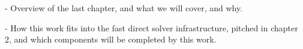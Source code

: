 - Overview of the last chapter, and what we will cover, and why.

- How this work fits into the fast direct solver infrastructure, pitched in chapter 2, and which components will be completed by this work.

